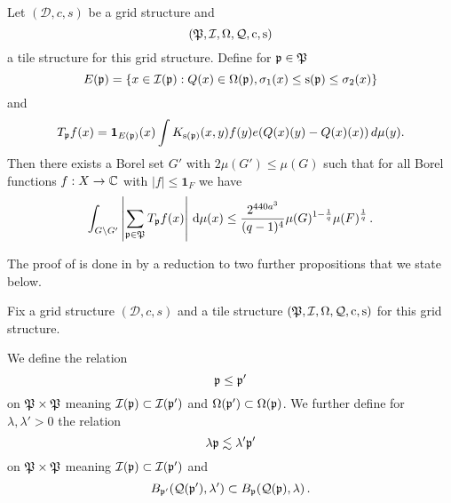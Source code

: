 \begin{proposition}
\label{discrete-Carleson}
\leanok
{}
Let $(\mathcal{D}, c, s)$ be a grid structure and
\begin{equation*}
    ({\mathfrak P},{\mathcal{I}},{\Omega},{\mathcal{Q}},{\mathrm{c}},{\mathrm{s}})
\end{equation*}
a tile structure for this grid structure.
Define for ${\mathfrak p}\in {\mathfrak P}$
\begin{equation}\label{defineep}
    E({\mathfrak p})=\{x\in {\mathcal{I}}({\mathfrak p}): {Q}(x)\in {\Omega}({\mathfrak p}) , {\sigma_1}(x)\le {\mathrm{s}}({\mathfrak p})\le {\sigma_2}(x)\}
\end{equation}
and
\begin{equation}\label{definetp}
    T_{{\mathfrak p}} f(x)= \mathbf{1}_{E({\mathfrak p})}(x) \int K_{{\mathrm{s}}({\mathfrak p})}(x,y) f(y) e({Q}(x)(y)-{Q}(x)(x))\, d\mu(y).
\end{equation}
Then there exists a Borel set $G'$ with $2\mu(G') \leq \mu(G)$ such that for all Borel functions $f:X\to {\mathbb{C}}$ with $|f|\le \mathbf{1}_F$
we have
\begin{equation}
    \label{disclesssim}
   \int_{G \setminus G'} \left| \sum_{{\mathfrak p} \in {\mathfrak P}} T_{{\mathfrak p}} f (x) \right| \, \mathrm{d}\mu(x) \le \frac{2^{440a^3}}{(q-1)^4} \mu(G)^{1-\frac{1}{q}} \mu(F)^{\frac{1}{q}}\,.
\end{equation}
\end{proposition}









The proof of  is done in 
by a reduction to two further propositions that we state below.


Fix a grid structure $(\mathcal{D}, c, s)$ and a tile structure $({\mathfrak P},{\mathcal{I}},{\Omega},{\mathcal{Q}},{\mathrm{c}},{\mathrm{s}})$
for this grid structure.

We define the relation
\begin{equation}\label{straightorder}
    {\mathfrak p}\le {\mathfrak p}'
\end{equation}
 on ${\mathfrak P}\times {\mathfrak P}$ meaning
${\mathcal{I}}({\mathfrak p})\subset {\mathcal{I}}({\mathfrak p}')$ and
$\Omega({\mathfrak p}')\subset \Omega({\mathfrak p})$.
We further define for $\lambda,\lambda' >0$
the relation
\begin{equation}\label{wiggleorder}
    \lambda {\mathfrak p} \lesssim \lambda' {\mathfrak p}'
\end{equation}
on ${\mathfrak P}\times {\mathfrak P}$ meaning
${\mathcal{I}}({\mathfrak p})\subset {\mathcal{I}}({\mathfrak p}')$ and
\begin{equation}
    B_{{\mathfrak p}'}({\mathcal{Q}}({\mathfrak p}'),\lambda') \subset B_{{\mathfrak p}}({\mathcal{Q}}({\mathfrak p}),\lambda)\, .
\end{equation}




